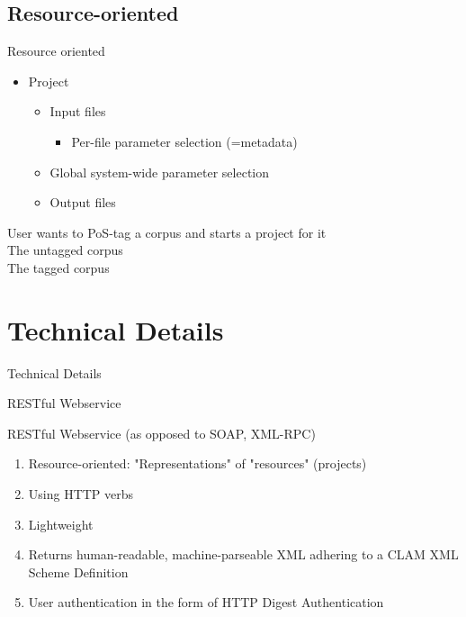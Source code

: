 \documentclass[compress]{beamer}
\begin{document}
\subsection{Resource-oriented}
\begin{frame}

    \begin{block}{Resource oriented}
   
        \begin{itemize}
            \item Project
            \begin{itemize}
                \item Input files
                \begin{itemize}
                    \item Per-file parameter selection (=metadata)
                \end{itemize}
                \item Global system-wide parameter selection
                \item Output files
            \end{itemize}
        \end{itemize}

    \end{block}

    \begin{example}
         User wants to PoS-tag a corpus and starts a project for it \\
         The untagged corpus \\
         The tagged corpus \\
    \end{example}

\end{frame}


\section{Technical Details}

\begin{frame}{Technical Details}


    \begin{block}{RESTful Webservice}
        
        RESTful Webservice (as opposed to SOAP, XML-RPC)

        \begin{enumerate}
            \item Resource-oriented: "Representations" of "resources" (projects)
            \item Using HTTP verbs
            \item Lightweight
            \item Returns human-readable, machine-parseable XML adhering to a CLAM XML Scheme Definition %
            \item User authentication in the form of HTTP Digest Authentication
        \end{enumerate}    
    \end{block}
\end{frame}
\end{document}
